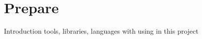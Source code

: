 \documentclass{book}
\begin{document}
\chapter{Prepare}
\author{Thuong}

Introduction tools, libraries, languages with using in this project

\end{document}
